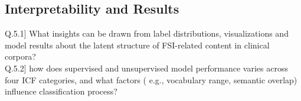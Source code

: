 \subsection{Interpretability and Results}
Q.5.1] What insights can be drawn from label distributions, visualizations and model results about the latent structure of FSI-related content in clinical corpora?\\
Q.5.2] how does supervised and unsupervised model performance varies across four ICF categories, and what factors ( e.g., vocabulary range, semantic overlap) influence classification process?

